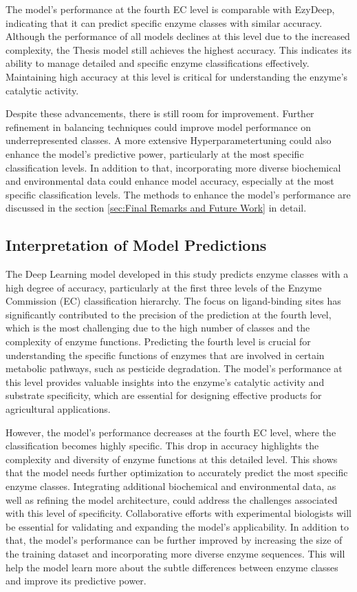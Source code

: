 The model's performance at the fourth EC level is comparable with EzyDeep, indicating that it can predict specific enzyme classes with similar accuracy. Although the performance of all models declines at this level due to the increased complexity, the Thesis model still achieves the highest accuracy. This indicates its ability to manage detailed and specific enzyme classifications effectively. Maintaining high accuracy at this level is critical for understanding the enzyme's catalytic activity.

Despite these advancements, there is still room for improvement. Further refinement in balancing techniques could improve model performance on underrepresented classes. A more extensive Hyperparametertuning could also enhance the model's predictive power, particularly at the most specific classification levels. In addition to that, incorporating more diverse biochemical and environmental data could enhance model accuracy, especially at the most specific classification levels. The methods to enhance the model's performance are discussed in the section \ref{sec:Final Remarks and Future Work} in detail.

\subsection{Interpretation of Model Predictions}
\label{sec:Interpretation of Model Predictions}

The Deep Learning model developed in this study predicts enzyme classes with a high degree of accuracy, particularly at the first three levels of the Enzyme Commission (EC) classification hierarchy. The focus on ligand-binding sites has significantly contributed to the precision of the prediction at the fourth level, which is the most challenging due to the high number of classes and the complexity of enzyme functions. Predicting the fourth level is crucial for understanding the specific functions of enzymes that are involved in certain metabolic pathways, such as pesticide degradation. The model's performance at this level provides valuable insights into the enzyme's catalytic activity and substrate specificity, which are essential for designing effective products for agricultural applications.

However, the model's performance decreases at the fourth EC level, where the classification becomes highly specific. This drop in accuracy highlights the complexity and diversity of enzyme functions at this detailed level. This shows that the model needs further optimization to accurately predict the most specific enzyme classes. Integrating additional biochemical and environmental data, as well as refining the model architecture, could address the challenges associated with this level of specificity. Collaborative efforts with experimental biologists will be essential for validating and expanding the model’s applicability. In addition to that, the model's performance can be further improved by increasing the size of the training dataset and incorporating more diverse enzyme sequences. This will help the model learn more about the subtle differences between enzyme classes and improve its predictive power.

